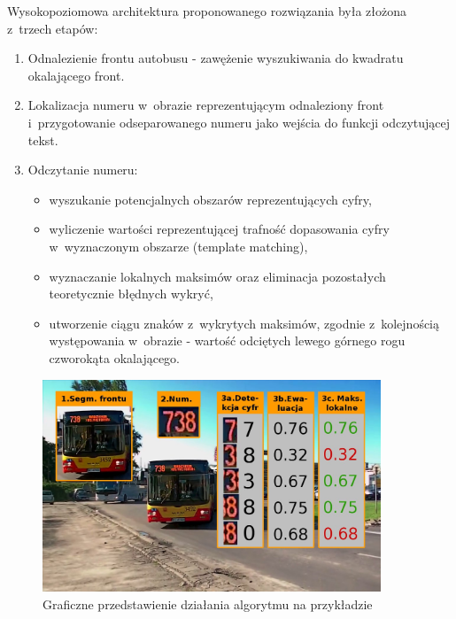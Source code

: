 Wysokopoziomowa architektura proponowanego rozwiązania była złożona 
z~trzech etapów:
\begin{enumerate}
	\item Odnalezienie frontu autobusu - zawężenie wyszukiwania 
	do kwadratu okalającego front.
	\item Lokalizacja numeru w~obrazie reprezentującym odnaleziony
	front i~przygotowanie odseparowanego numeru jako wejścia
	do funkcji odczytującej tekst.
	\item Odczytanie numeru:
	\begin{itemize}
		\item wyszukanie potencjalnych obszarów reprezentujących
		cyfry,
		\item wyliczenie wartości reprezentującej trafność
		dopasowania cyfry w~wyznaczonym obszarze (template
		matching),
		\item wyznaczanie lokalnych maksimów oraz eliminacja 
		pozostałych teoretycznie błędnych wykryć,
		\item utworzenie ciągu znaków z~wykrytych maksimów,
		zgodnie z~kolejnością występowania w~obrazie -
		wartość odciętych lewego górnego rogu czworokąta
		okalającego.
	\end{itemize}
\end{enumerate}

\begin{figure}[!h]
	\centering
	\includegraphics[width=0.9\textwidth]{img/exp_alg_explanation}
	\caption{Graficzne przedstawienie działania algorytmu na przykładzie}
	\label{fig:algexp}
\end{figure}


